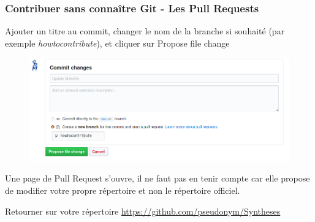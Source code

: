 \documentclass{beamer}
\newenvironment{wideitemize}{\itemize\addtolength{\itemsep}{10pt}}{\enditemize}
\begin{document}
\begin{frame}
    \frametitle{Contribuer sans connaître Git - Les Pull Requests}
    \begin{wideitemize}
        \item Ajouter un titre au commit, changer le nom de la branche si souhaité (par exemple \textit{howtocontribute}), et cliquer sur Propose file change
        \begin{figure}[H]
            \centering
            \includegraphics[width=0.8\linewidth]{modif_online_commit.png}
        \end{figure}
        \item Une page de Pull Request s'ouvre, il ne faut pas en tenir compte car elle propose de modifier votre propre répertoire et non le répertoire officiel.
        \item Retourner sur votre répertoire \url{https://github.com/pseudonym/Syntheses}
     \end{wideitemize}
\end{frame}
\end{document}
